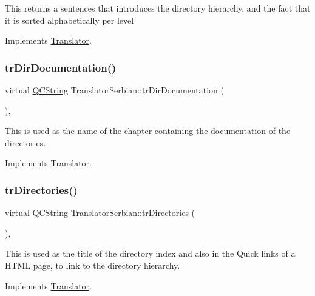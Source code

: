 This returns a sentences that introduces the directory hierarchy. and the fact that it is sorted alphabetically per level 

Implements \mbox{\hyperlink{class_translator}{Translator}}.

\mbox{\label{class_translator_serbian_a4761700bf139127dd54021453221bf56}} 
\subsubsection{\texorpdfstring{trDirDocumentation()}{trDirDocumentation()}}
{\footnotesize\ttfamily virtual \mbox{\hyperlink{class_q_c_string}{Q\+C\+String}} Translator\+Serbian\+::tr\+Dir\+Documentation (\begin{DoxyParamCaption}{ }\end{DoxyParamCaption})\hspace{0.3cm}{\ttfamily [inline]}, {\ttfamily [virtual]}}

This is used as the name of the chapter containing the documentation of the directories. 

Implements \mbox{\hyperlink{class_translator}{Translator}}.

\mbox{\label{class_translator_serbian_a3140a11a8f74d575f223ec0692e511f9}} 
\subsubsection{\texorpdfstring{trDirectories()}{trDirectories()}}
{\footnotesize\ttfamily virtual \mbox{\hyperlink{class_q_c_string}{Q\+C\+String}} Translator\+Serbian\+::tr\+Directories (\begin{DoxyParamCaption}{ }\end{DoxyParamCaption})\hspace{0.3cm}{\ttfamily [inline]}, {\ttfamily [virtual]}}

This is used as the title of the directory index and also in the Quick links of a H\+T\+ML page, to link to the directory hierarchy. 

Implements \mbox{\hyperlink{class_translator}{Translator}}.

